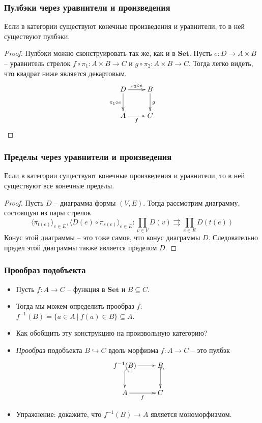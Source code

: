 \documentclass{beamer}
\makeatletter
\theoremstyle{definition}
\newcommand{\cat}[1]{\mathbf{#1}}
\newcommand{\Set}{\cat{Set}}
\newcommand{\pb}[1][dr]{\save*!/#1-1.2pc/#1:(-1,1)@^{|-}\restore}
\makeatother
\begin{document}
\begin{frame}
\frametitle{Пулбэки через уравнители и произведения}
\begin{prop}
Если в категории существуют конечные произведения и уравнители, то в ней существуют пулбэки.
\end{prop}
\begin{proof}
Пулбэки можно сконструировать так же, как и в $\Set$.
Пусть $e : D \to A \times B$ -- уравнитель стрелок $f \circ \pi_1 : A \times B \to C$ и $g \circ \pi_2 : A \times B \to C$.
Тогда легко видеть, что квадрат ниже является декартовым.
\[ \xymatrix{ D \ar[d]_{\pi_1 \circ e} \ar[r]^{\pi_2 \circ e} & B \ar[d]^g \\
              A \ar[r]_f                                      & C
            } \]
\end{proof}
\end{frame}

\begin{frame}
\frametitle{Пределы через уравнители и произведения}
\begin{prop}
Если в категории существуют конечные произведения и уравнители, то в ней существуют все конечные пределы.
\end{prop}
\begin{proof}
Пусть $D$ -- диаграмма формы $(V,E)$. Тогда рассмотрим диаграмму, состоящую из пары стрелок
\[ \langle \pi_{t(e)} \rangle_{e \in E}, \langle D(e) \circ \pi_{s(e)} \rangle_{e \in E} : \prod_{v \in V} D(v) \rightrightarrows \prod_{e \in E} D(t(e)) \]
Конус этой диаграммы -- это тоже самое, что конус диаграммы $D$.
Следовательно предел этой диаграммы также является пределом $D$.
\end{proof}
\end{frame}

\begin{frame}
\frametitle{Прообраз подобъекта}
\begin{itemize}
\item Пусть $f : A \to C$ -- функция в $\Set$ и $B \subseteq C$.
\item Тогда мы можем определить прообраз $f$: $f^{-1}(B) = \{ a \in A\ |\ f(a) \in B \} \subseteq A$.
\item Как обобщить эту конструкцию на произвольную категорию?
\item \emph{Прообраз} подобъекта $B \hookrightarrow C$ вдоль морфизма $f : A \to C$ -- это пулбэк
\[ \xymatrix{ f^{-1}(B) \ar@{^{(}->}[d] \ar[r] \pb & B \ar@{^{(}->}[d] \\
              A \ar[r]_f                           & C
            } \]
\item Упражнение: докажите, что $f^{-1}(B) \to A$ является мономорфизмом.
\end{itemize}
\end{frame}
\end{document}
